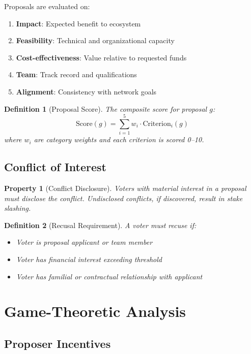 \documentclass[11pt,a4paper]{article}
\newtheorem{definition}{Definition}
\newtheorem{property}{Property}
\begin{document}
Proposals are evaluated on:

\begin{enumerate}
    \item \textbf{Impact}: Expected benefit to ecosystem
    \item \textbf{Feasibility}: Technical and organizational capacity
    \item \textbf{Cost-effectiveness}: Value relative to requested funds
    \item \textbf{Team}: Track record and qualifications
    \item \textbf{Alignment}: Consistency with network goals
\end{enumerate}

\begin{definition}[Proposal Score]
The composite score for proposal $g$:
\[
\text{Score}(g) = \sum_{i=1}^{5} w_i \cdot \text{Criterion}_i(g)
\]
where $w_i$ are category weights and each criterion is scored 0--10.
\end{definition}

\subsection{Conflict of Interest}

\begin{property}[Conflict Disclosure]
Voters with material interest in a proposal must disclose the conflict. Undisclosed conflicts, if discovered, result in stake slashing.
\end{property}

\begin{definition}[Recusal Requirement]
A voter must recuse if:
\begin{itemize}
    \item Voter is proposal applicant or team member
    \item Voter has financial interest exceeding threshold
    \item Voter has familial or contractual relationship with applicant
\end{itemize}
\end{definition}

\section{Game-Theoretic Analysis}

\subsection{Proposer Incentives}
\end{document}
